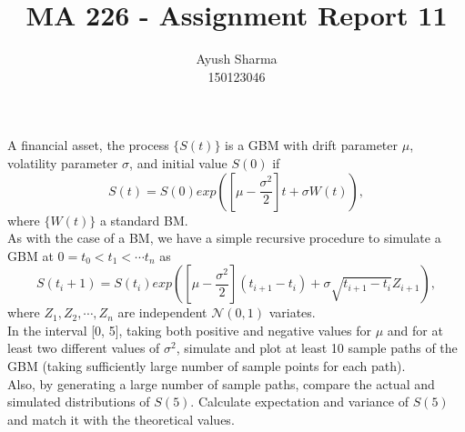 \documentclass[11pt]{article}
\title{MA 226 - Assignment Report 11}
\author{Ayush Sharma\\150123046}
\begin{document}
\titlepage
\newpage
A financial asset, the process $\{S(t)\}$ is a GBM with drift parameter $\mu$, volatility parameter $\sigma$, and initial value $S(0)$ if
$$S(t) = S(0)exp([\mu - \frac{\sigma^{2}}{2}]t + \sigma W(t)),$$
\hspace{10mm}where $\{W(t)\}$ a standard BM.\\
As with the case of a BM, we have a simple recursive procedure to simulate a GBM at $0 = t_0 < t_1 < \cdots t_n$ as
$$S(t_i + 1) = S(t_i) exp([\mu - \frac{\sigma^{2}}{2}](t_{i+1} - t_i) + \sigma \sqrt{t_{i+1} - t_i}Z_{i+1}),$$
\hspace{10mm}where $Z_1, Z_2, \cdots , Z_n$ are independent $\mathcal{N}(0, 1)$ variates.\\
In the interval [0, 5], taking both positive and negative values for $\mu$ and for at least two different values of $\sigma^2$, simulate and plot at least 10 sample paths of the GBM (taking sufficiently large number of sample points for each path).\\
Also, by generating a large number of sample paths, compare the actual and simulated distributions of $S(5)$.
Calculate expectation and variance of $S(5)$ and match it with the theoretical values.\\
\newpage
{}
\end{document}

